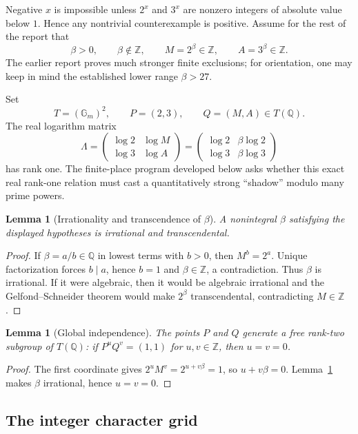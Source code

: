\documentclass[11pt]{article}
\newtheorem{lemma}[theorem]{Lemma}
\theoremstyle{definition}
\theoremstyle{remark}
\newcommand{\Z}{\mathbb Z}
\newcommand{\Q}{\mathbb Q}
\newcommand{\Gm}{\mathbb G_m}
\newcommand{\Torus}{T}
\begin{document}
Negative $x$ is impossible unless $2^x$ and $3^x$ are nonzero integers of absolute value below $1$.  Hence any nontrivial counterexample is positive.  Assume for the rest of the report that
\[
\beta>0,\qquad \beta\notin\Z,\qquad M=2^\beta\in\Z,\qquad A=3^\beta\in\Z.
\]
The earlier report proves much stronger finite exclusions; for orientation, one may keep in mind the established lower range $\beta>27$.

Set
\[
\Torus=(\Gm)^2,\qquad P=(2,3),\qquad Q=(M,A)\in \Torus(\Q).
\]
The real logarithm matrix
\[
\Lambda=\begin{pmatrix}
\log2&\log M\\
\log3&\log A
\end{pmatrix}
=\begin{pmatrix}
\log2&\beta\log2\\
\log3&\beta\log3
\end{pmatrix}
\]
has rank one.  The finite-place program developed below asks whether this exact real rank-one relation must cast a quantitatively strong ``shadow'' modulo many prime powers.

\begin{lemma}[Irrationality and transcendence of $\beta$]\label{lem:beta-trans}
A nonintegral $\beta$ satisfying the displayed hypotheses is irrational and transcendental.
\end{lemma}

\begin{proof}
If $\beta=a/b\in\Q$ in lowest terms with $b>0$, then $M^b=2^a$.  Unique factorization forces $b\mid a$, hence $b=1$ and $\beta\in\Z$, a contradiction.  Thus $\beta$ is irrational.  If it were algebraic, then it would be algebraic irrational and the Gelfond--Schneider theorem would make $2^\beta$ transcendental, contradicting $M\in\Z$.
\end{proof}

\begin{lemma}[Global independence]\label{lem:global-independence}
The points $P$ and $Q$ generate a free rank-two subgroup of $\Torus(\Q)$: if $P^uQ^v=(1,1)$ for $u,v\in\Z$, then $u=v=0$.
\end{lemma}

\begin{proof}
The first coordinate gives $2^uM^v=2^{u+v\beta}=1$, so $u+v\beta=0$.  Lemma~\ref{lem:beta-trans} makes $\beta$ irrational, hence $u=v=0$.
\end{proof}

\subsection{The integer character grid}
\end{document}
